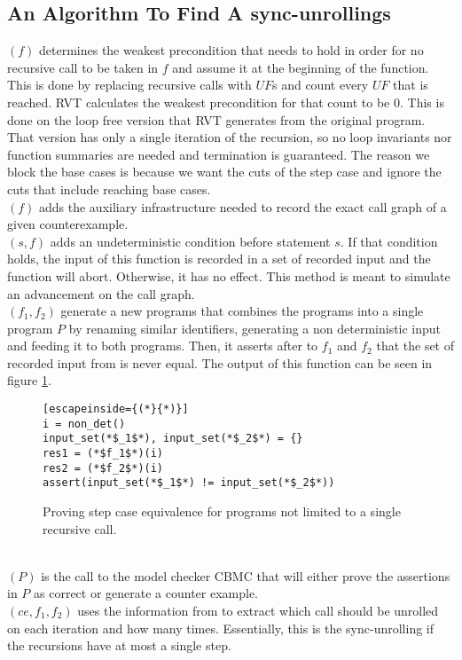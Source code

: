 \subsection{An Algorithm To Find A sync-unrollings}
$(f)$ determines the weakest precondition that needs to hold in order for no recursive call to be taken in $f$ and assume it at the beginning of the function. This is done by replacing recursive calls with $UF$s and count every $UF$ that is reached. RVT calculates the weakest precondition for that count to be 0. This is done on the loop free version that RVT generates from the original program. That version has only a single iteration of the recursion, so no loop invariants nor function summaries are needed and termination is guaranteed. The reason we block the base cases is because we want the cuts of the step case and ignore the cuts that include reaching base cases.  
\\ $(f)$ adds the auxiliary infrastructure needed to record the exact call graph of a given counterexample.
\\ $(s,f)$ adds an undeterministic condition before statement $s$. If that condition holds, the input of this function is recorded in a set of recorded input and the function will abort. Otherwise, it has no effect.  This method is meant to simulate an advancement on the call graph.
\\ $(f_1,f_2)$ generate a new programs that combines the programs into a single program $P$ by renaming similar identifiers, generating a non deterministic input and feeding it to both programs. Then, it asserts after to $f_1$ and $f_2$ that the set of recorded input from  is never equal. The output of this function can be seen in figure \ref{fig:findcutverfprogram}.
\begin{figure} [h]
\begin{center}
\begin{minipage}{7 cm}
\begin{lstlisting}[escapeinside={(*}{*)}]
i = non_det()
input_set(*$_1$*), input_set(*$_2$*) = {}
res1 = (*$f_1$*)(i)
res2 = (*$f_2$*)(i)
assert(input_set(*$_1$*) != input_set(*$_2$*))
\end{lstlisting}
\end{minipage}
\caption{Proving step case equivalence for programs not limited to a single recursive call.}
\label{fig:findcutverfprogram}
\end{center}
\end{figure}
\\$(P)$ is the call to the model checker CBMC that will either prove the assertions in $P$ as correct or generate a counter example.
\\$(ce,f_1,f_2)$ uses the information from  to extract which call should be unrolled on each iteration and how many times. Essentially, this is the sync-unrolling if the recursions have at most a single step. 

